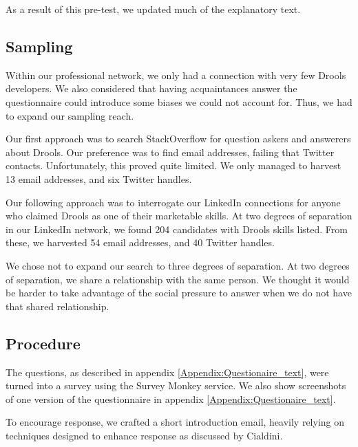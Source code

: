 As a result of this pre-test, we updated much of the explanatory text.

\subsection{Sampling}
Within our professional network, we only had a connection with very few Drools developers.
We also considered that having acquaintances answer the questionnaire could introduce some biases we could not account for.
Thus, we had to expand our sampling reach.

Our first approach was to search StackOverflow for question askers and answerers about Drools.
Our preference was to find email addresses, failing that Twitter contacts.
Unfortunately, this proved quite limited.
We only managed to harvest 13 email addresses, and six Twitter handles.

Our following approach was to interrogate our LinkedIn connections for anyone who claimed Drools as one of their marketable skills.
At two degrees of separation in our LinkedIn network, we found 204 candidates with Drools skills listed.
From these, we harvested 54 email addresses, and 40 Twitter handles.

We chose not to expand our search to three degrees of separation.
At two degrees of separation, we share a relationship with the same person.
We thought it would be harder to take advantage of the social pressure to answer when we do not have that shared relationship.

\subsection{Procedure}

The questions, as described in appendix \ref{Appendix:Questionaire_text}, were turned into a survey using the Survey Monkey service.
We also show screenshots of one version of the questionnaire in appendix \ref{Appendix:Questionaire_text}.

To encourage response, we crafted a short introduction email, heavily relying on techniques designed to enhance response as discussed by  Cialdini\cite{goldstein2008yes}.
